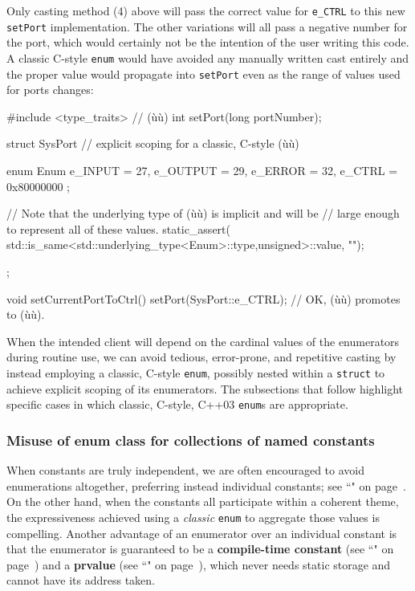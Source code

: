 \noindent Only casting method (4) above will pass the correct value for
\texttt{e\_CTRL} to this new \texttt{setPort} implementation. The other
variations will all pass a negative number for the port, which would
certainly not be the intention of the user writing this code. A classic
C-style \texttt{enum} would have avoided any manually written cast
entirely and the proper value would propagate into \texttt{setPort} even
as the range of values used for ports changes:

\begin{emcppshiddenlisting}[emcppsbatch=e12]
#include <type_traits>  // (ù{}ù)
int setPort(long portNumber);
\end{emcppshiddenlisting}
\begin{emcppslisting}[emcppsbatch=e12]
struct SysPort  // explicit scoping for a classic, C-style (ù{}ù)
{
    enum Enum { e_INPUT = 27, e_OUTPUT = 29, e_ERROR = 32,
                e_CTRL = 0x80000000 };

    // Note that the underlying type of (ù{}ù) is implicit and will be
    // large enough to represent all of these values.
    static_assert(
        std::is_same<std::underlying_type<Enum>::type,unsigned>::value, "");
};

void setCurrentPortToCtrl()
{
    setPort(SysPort::e_CTRL);  // OK, (ù{}ù) promotes to (ù{}ù).
}
\end{emcppslisting}

\noindent When the intended client will depend on the cardinal values of the
enumerators during routine use, we can avoid tedious, error-prone, and
repetitive casting by instead employing a classic, C-style
\texttt{enum}, possibly nested within a \texttt{struct} to achieve
explicit scoping of its enumerators. The subsections that follow
highlight specific cases in which classic, C-style, C++03
\texttt{enum}s are appropriate.

\subsubsection[Misuse of {\tt enum} {\tt class} for collections of named constants]{Misuse of {\SubsubsecCode enum} {\SubsubsecCode class} for collections of named constants}\label{misuse-of-enum-class-for-collections-of-named-constants}

When constants are truly independent, we are often encouraged to avoid
enumerations altogether, preferring instead individual constants; see
``" on page~\pageref{Default-Member-Initializers}. On the other hand, when the constants all participate within a coherent
theme, the expressiveness achieved using a \emph{classic} \texttt{enum}
to aggregate those values is compelling. Another
advantage of an enumerator over an individual constant is that the
enumerator is guaranteed to be a \textbf{compile-time constant} (see
  ``" on page~\pageref{constexprvar}) and a \textbf{prvalue} (see
  ``" on page~\pageref{Rvalue-References}), which never needs static storage
  and cannot have its address taken.

